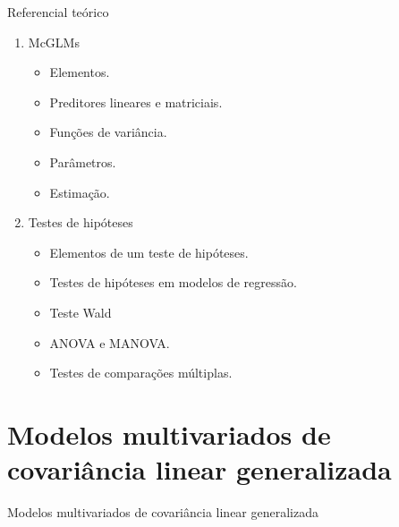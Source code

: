 \documentclass[
  ignorenonframetext,
  serif,
  professionalfont,
  usenames,
  dvipsnames,
  aspectratio = 169]{beamer}
\begin{document}
\begin{frame}{Referencial teórico}
\protect\hypertarget{referencial-teuxf3rico-1}{}
\begin{enumerate}
    \itemsep 2ex
    
  \item McGLMs
    \begin{itemize}
      \item Elementos.
      \item Preditores lineares e matriciais.
      \item Funções de variância.
      \item Parâmetros.
      \item Estimação.
    \end{itemize}
    
  \item Testes de hipóteses
    \begin{itemize}
      \item Elementos de um teste de hipóteses.
      \item Testes de hipóteses em modelos de regressão.
      \item Teste Wald
      \item ANOVA e MANOVA.
      \item Testes de comparações múltiplas.
    \end{itemize}
\end{enumerate}
\end{frame}

\hypertarget{modelos-multivariados-de-covariuxe2ncia-linear-generalizada-3}{%
\section{Modelos multivariados de covariância linear
generalizada}\label{modelos-multivariados-de-covariuxe2ncia-linear-generalizada-3}}

\begin{frame}{Modelos multivariados de covariância linear generalizada}
\end{frame}
\end{document}
